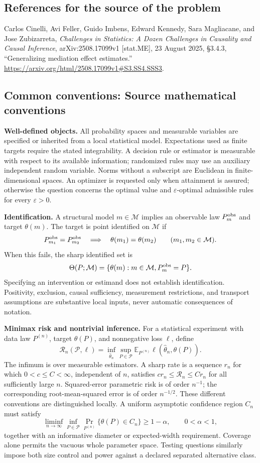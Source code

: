 \documentclass[11pt,a4paper]{article}
\newcommand{\E}{\mathbb E}
\begin{document}
\subsection*{References for the source of the problem}
Carlos Cinelli, Avi Feller, Guido Imbens, Edward Kennedy, Sara Magliacane, and Jose Zubizarreta, \emph{Challenges in Statistics: A Dozen Challenges in Causality and Causal Inference}, arXiv:2508.17099v1 [stat.ME], 23 August 2025, \S3.4.3, ``Generalizing mediation effect estimates.'' \url{https://arxiv.org/html/2508.17099v1#S3.SS4.SSS3}.

\subsection*{Common conventions: Source mathematical conventions}

\textbf{Well-defined objects.}
All probability spaces and measurable variables are specified or inherited
from a local statistical model. Expectations used as finite targets require
the stated integrability. A decision rule or estimator is measurable with
respect to its available information; randomized rules may use an auxiliary
independent random variable. Norms without a subscript are Euclidean in
finite-dimensional spaces. An optimizer is requested only when attainment
is assured; otherwise the question concerns the optimal value and
$\varepsilon$-optimal admissible rules for every $\varepsilon>0$.

\textbf{Identification.}
A structural model $m\in\mathcal M$ implies an observable law
$P_m^{\rm obs}$ and target $\theta(m)$. The target is point identified on
$\mathcal M$ if
\[
 P_{m_1}^{\rm obs}=P_{m_2}^{\rm obs}
 \quad\Longrightarrow\quad\theta(m_1)=\theta(m_2)
 \qquad(m_1,m_2\in\mathcal M).
\]
When this fails, the sharp identified set is
\[
 \Theta(P;\mathcal M)=\{\theta(m):m\in\mathcal M,
                                  P_m^{\rm obs}=P\}.
\]
Specifying an intervention or estimand does not establish identification.
Positivity, exclusion, causal sufficiency, measurement restrictions, and
transport assumptions are substantive local inputs, never automatic
consequences of notation.

\textbf{Minimax risk and nontrivial inference.}
For a statistical experiment with data law $P^{(n)}$, target $\theta(P)$,
and nonnegative loss $\ell$, define
\[
 \mathcal R_n(\mathcal P,\ell)
   =\inf_{\widehat\theta_n}\sup_{P\in\mathcal P}
      \E_{P^{(n)}}\ell(\widehat\theta_n,\theta(P)).
\]
The infimum is over measurable estimators. A sharp rate is a sequence
$r_n$ for which $0<c\leq C<\infty$, independent of $n$, satisfies
$c r_n\leq\mathcal R_n\leq C r_n$ for all sufficiently large $n$.
Squared-error parametric risk is of order $n^{-1}$; the corresponding
root-mean-squared error is of order $n^{-1/2}$. These different conventions
are distinguished locally. A uniform asymptotic confidence region $C_n$
must satisfy
\[
 \liminf_{n\to\infty}\inf_{P\in\mathcal P}
     \Pr_{P^{(n)}}\{\theta(P)\in C_n\}\geq 1-\alpha,
 \qquad 0<\alpha<1,
\]
together with an informative diameter or expected-width requirement.
Coverage alone permits the vacuous whole parameter space. Testing questions
similarly impose both size control and power against a declared separated
alternative class.
\end{document}
